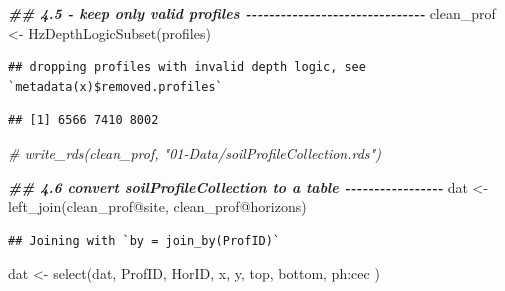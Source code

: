 \documentclass[
  10pt,
  b5paper,
  oneside]{book}
\newenvironment{Shaded}{\begin{snugshade}}{\end{snugshade}}
\newcommand{\CommentTok}[1]{\textcolor[rgb]{0.56,0.35,0.01}{\textit{#1}}}
\newcommand{\DocumentationTok}[1]{\textcolor[rgb]{0.56,0.35,0.01}{\textbf{\textit{#1}}}}
\newcommand{\FunctionTok}[1]{\textcolor[rgb]{0.00,0.00,0.00}{#1}}
\newcommand{\NormalTok}[1]{#1}
\newcommand{\OtherTok}[1]{\textcolor[rgb]{0.56,0.35,0.01}{#1}}
\newcommand{\SpecialCharTok}[1]{\textcolor[rgb]{0.00,0.00,0.00}{#1}}
\begin{document}
\begin{Shaded}
\begin{Highlighting}[]
\DocumentationTok{\#\# 4.5 {-} keep only valid profiles {-}{-}{-}{-}{-}{-}{-}{-}{-}{-}{-}{-}{-}{-}{-}{-}{-}{-}{-}{-}{-}{-}{-}{-}{-}{-}{-}{-}{-}{-}{-}}
\NormalTok{clean\_prof }\OtherTok{\textless{}{-}} \FunctionTok{HzDepthLogicSubset}\NormalTok{(profiles)}
\end{Highlighting}
\end{Shaded}

\begin{verbatim}
## dropping profiles with invalid depth logic, see `metadata(x)$removed.profiles`
\end{verbatim}

\begin{Shaded}
\end{Shaded}

\begin{verbatim}
## [1] 6566 7410 8002
\end{verbatim}

\begin{Shaded}
\begin{Highlighting}[]
\CommentTok{\# write\_rds(clean\_prof, "01{-}Data/soilProfileCollection.rds")}

\DocumentationTok{\#\# 4.6 convert soilProfileCollection to a table {-}{-}{-}{-}{-}{-}{-}{-}{-}{-}{-}{-}{-}{-}{-}{-}{-}}
\NormalTok{dat }\OtherTok{\textless{}{-}} \FunctionTok{left\_join}\NormalTok{(clean\_prof}\SpecialCharTok{@}\NormalTok{site, clean\_prof}\SpecialCharTok{@}\NormalTok{horizons)}
\end{Highlighting}
\end{Shaded}

\begin{verbatim}
## Joining with `by = join_by(ProfID)`
\end{verbatim}

\begin{Shaded}
\begin{Highlighting}[]
\NormalTok{dat }\OtherTok{\textless{}{-}} \FunctionTok{select}\NormalTok{(dat, ProfID, HorID, x, y, top, bottom, ph}\SpecialCharTok{:}\NormalTok{cec )}
\end{Highlighting}
\end{Shaded}
\end{document}
